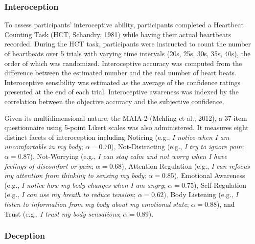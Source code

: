 \documentclass[
  man,mask,floatsintext]{apa6}
\begin{document}
\subsubsection{Interoception}\label{interoception}

To assess participants' interoceptive ability, participants completed a Heartbeat Counting Task (HCT, Schandry, 1981) while having their actual heartbeats recorded. During the HCT task, participants were instructed to count the number of heartbeats over 5 trials with varying time intervals (20s, 25s, 30s, 35s, 40s), the order of which was randomized. Interoceptive accuracy was computed from the difference between the estimated number and the real number of heart beats. Interoceptive sensibility was estimated as the average of the confidence ratings presented at the end of each trial. Interoceptive awareness was indexed by the correlation between the objective accuracy and the subjective confidence.

Given its multidimensional nature, the MAIA-2 (Mehling et al., 2012), a 37-item questionnaire using 5-point Likert scales was also administered. It measures eight distinct facets of interoception including Noticing (e.g., \emph{I notice when I am uncomfortable in my body}; \(\alpha = 0.70\)), Not-Distracting (e.g., \emph{I try to ignore pain}; \(\alpha = 0.87\)), Not-Worrying (e.g., \emph{I can stay calm and not worry when I have feelings of discomfort or pain}; \(\alpha = 0.68\)), Attention Regulation (e.g., \emph{I can refocus my attention from thinking to sensing my body}; \(\alpha = 0.85\)), Emotional Awareness (e.g., \emph{I notice how my body changes when I am angry}; \(\alpha = 0.75\)), Self-Regulation (e.g., \emph{I can use my breath to reduce tension}; \(\alpha = 0.62\)), Body Listening (e.g., \emph{I listen to information from my body about my emotional state}; \(\alpha = 0.88\)), and Trust (e.g., \emph{I trust my body sensations}; \(\alpha = 0.89\)).

\subsubsection{Deception}\label{deception}
\end{document}
